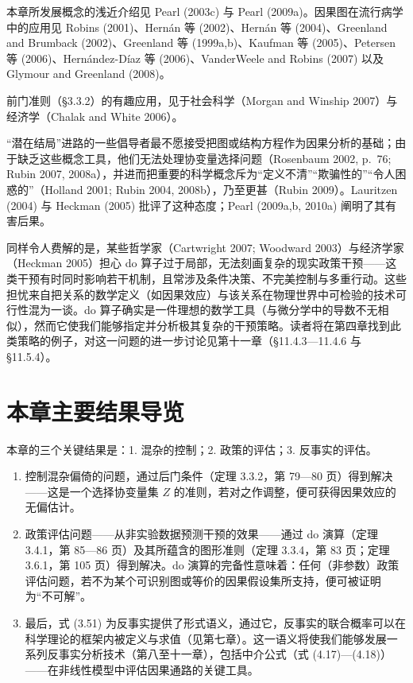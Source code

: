 本章所发展概念的浅近介绍见 Pearl (2003c) 与 Pearl (2009a)。因果图在流行病学中的应用见 Robins (2001)、Hernán 等 (2002)、Hernán 等 (2004)、Greenland and Brumback (2002)、Greenland 等 (1999a,b)、Kaufman 等 (2005)、Petersen 等 (2006)、Hernández-Díaz 等 (2006)、VanderWeele and Robins (2007) 以及 Glymour and Greenland (2008)。

前门准则（\S 3.3.2）的有趣应用，见于社会科学（Morgan and Winship 2007）与经济学（Chalak and White 2006）。

“潜在结局”进路的一些倡导者最不愿接受把图或结构方程作为因果分析的基础；由于缺乏这些概念工具，他们无法处理协变量选择问题（Rosenbaum 2002, p.~76; Rubin 2007, 2008a），并进而把重要的科学概念斥为“定义不清”“欺骗性的”“令人困惑的”（Holland 2001; Rubin 2004, 2008b），乃至更甚（Rubin 2009）。Lauritzen (2004) 与 Heckman (2005) 批评了这种态度；Pearl (2009a,b, 2010a) 阐明了其有害后果。

同样令人费解的是，某些哲学家（Cartwright 2007; Woodward 2003）与经济学家（Heckman 2005）担心 do 算子过于局部，无法刻画复杂的现实政策干预——这类干预有时同时影响若干机制，且常涉及条件决策、不完美控制与多重行动。这些担忧来自把关系的数学定义（如因果效应）与该关系在物理世界中可检验的技术可行性混为一谈。do 算子确实是一件理想的数学工具（与微分学中的导数不无相似），然而它使我们能够指定并分析极其复杂的干预策略。读者将在第四章找到此类策略的例子，对这一问题的进一步讨论见第十一章（\S 11.4.3—11.4.6 与 \S 11.5.4）。

\section*{本章主要结果导览}

本章的三个关键结果是：1. 混杂的控制；2. 政策的评估；3. 反事实的评估。
\begin{enumerate}[label=\arabic*.,leftmargin=1.8em]
\item 控制混杂偏倚的问题，通过后门条件（定理 3.3.2，第 79—80 页）得到解决——这是一个选择协变量集 $Z$ 的准则，若对之作调整，便可获得因果效应的无偏估计。
\item 政策评估问题——从非实验数据预测干预的效果——通过 do 演算（定理 3.4.1，第 85—86 页）及其所蕴含的图形准则（定理 3.3.4，第 83 页；定理 3.6.1，第 105 页）得到解决。do 演算的完备性意味着：任何（非参数）政策评估问题，若不为某个可识别图或等价的因果假设集所支持，便可被证明为“不可解”。
\item 最后，式 \textup{(3.51)} 为反事实提供了形式语义，通过它，反事实的联合概率可以在科学理论的框架内被定义与求值（见第七章）。这一语义将使我们能够发展一系列反事实分析技术（第八至十一章），包括中介公式（式 \textup{(4.17)}—\textup{(4.18)}）——在非线性模型中评估因果通路的关键工具。
\end{enumerate}
